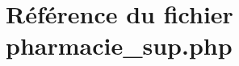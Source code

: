 \hypertarget{pharmacie__sup_8php}{
\section{R\'{e}f\'{e}rence du fichier pharmacie\_\-sup.php}
\label{pharmacie__sup_8php}
}
